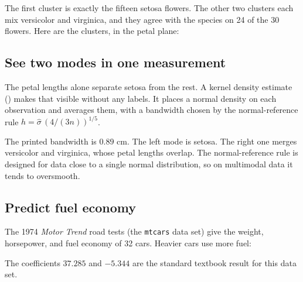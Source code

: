 The first cluster is exactly the fifteen setosa flowers. The other two clusters
each mix versicolor and virginica, and they agree with the species on 24 of the
30 flowers. Here are the clusters, in the petal plane:


\subsection*{See two modes in one measurement}

The petal lengths alone separate setosa from the rest. A kernel density estimate
() makes that visible without any labels. It places a
normal density on each observation and averages them, with a bandwidth chosen by
the normal-reference rule \(h = \hat\sigma\,(4/(3n))^{1/5}\).


The printed bandwidth is \(0.89\) cm. The left mode is setosa. The right one
merges versicolor and virginica, whose petal lengths overlap. The
normal-reference rule is designed for data close to a single normal distribution,
so on multimodal data it tends to oversmooth.

\subsection*{Predict fuel economy}

The 1974 \emph{Motor Trend} road tests (the \texttt{mtcars} data set) give the
weight, horsepower, and fuel economy of 32 cars. Heavier cars use more fuel:

\begin{codepairs}
\end{codepairs}

The coefficients \(37.285\) and \(-5.344\) are the standard textbook result for
this data set.



